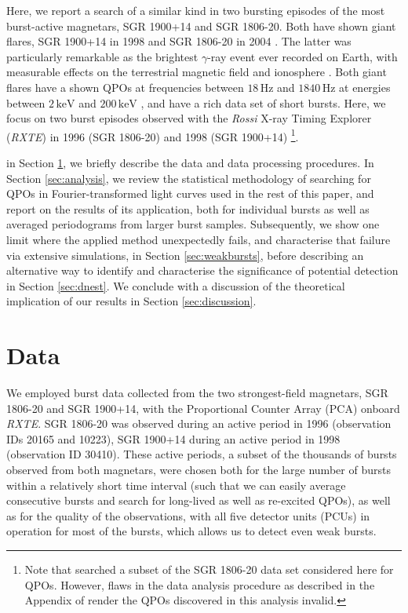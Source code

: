 \documentclass[numberedappendix]{emulateapj}
\newcommand{\hz}{\,\mathrm{Hz}}
\newcommand{\project}[1]{\textsl{#1}}
\newcommand{\rxte}{\project{RXTE}}
\begin{document}
Here, we report a search of a similar kind in two bursting episodes of the most burst-active magnetars, SGR 1900+14 and SGR 1806-20. Both have shown giant flares, SGR 1900+14 in 1998 \citep{cline1998,hurley1999,feroci1999} and SGR 1806-20 in 2004 \citep{palmer2005,hurley2004,hurley2005,mazets2005,borkowski2004,mereghetti2005,cameron2005}.  The latter was particularly remarkable as the brightest $\gamma$-ray event ever recorded on Earth, with measurable effects on the terrestrial magnetic field and ionosphere \citep{mandea2006,inan2007}. Both giant flares have a shown QPOs at frequencies between $18\hz$ and $1840\hz$ at energies between $2 \, \mathrm{keV}$ and $200 \, \mathrm{keV}$ \citep{strohmayer2005,israel2005,strohmayer2006,watts2006}, and have a rich data set of short bursts.
Here, we focus on two burst episodes observed with the \project{Rossi} X-ray Timing Explorer (\rxte) in 1996 (SGR 1806-20) \citep{gogus2000} and 1998 (SGR 1900+14) \citep{gogus1999} \footnote{Note that \citet{elmezeini2010} searched a subset of the SGR 1806-20 data set considered here for QPOs. However, flaws in the data analysis procedure as described in the Appendix of \citet{huppenkothen2013} render the QPOs discovered in this analysis invalid.}. 

in Section \ref{sec:data}, we briefly describe the data and data processing procedures. In Section \ref{sec:analysis}, we review the statistical methodology of searching for QPOs in Fourier-transformed light curves used in the rest of this paper, and report on the results of its application, both for individual bursts as well as averaged periodograms from larger burst samples. Subsequently, we show one limit where the applied method unexpectedly fails, and characterise that failure via extensive simulations, in Section \ref{sec:weakbursts}, before describing an alternative way to identify and characterise the significance of potential detection in Section \ref{sec:dnest}. We conclude with a discussion of the theoretical implication of our results in Section \ref{sec:discussion}.


\section{Data}
\label{sec:data}

We employed burst data collected from the two strongest-field magnetars, SGR 1806-20 and SGR 1900+14,  with the Proportional Counter Array (PCA) onboard \rxte. SGR 1806-20 was observed during an active period in 1996 (observation IDs 20165 and 10223), SGR 1900+14 during an active period in 1998 (observation ID 30410). These active periods, a subset of the thousands of bursts observed from both magnetars, were chosen both for the large number of bursts within a relatively short time interval (such that we can easily average consecutive bursts and search for long-lived as well as re-excited QPOs), as well as for the quality of the observations, with all five detector units (PCUs) in operation for most of the bursts, which allows us to detect even weak bursts.
\end{document}
